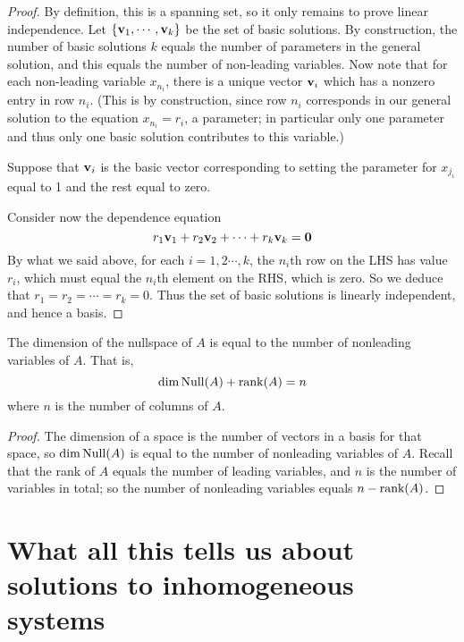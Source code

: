 \begin{proof}
By definition, this is a spanning set, so it only remains to prove linear independence.  Let $\{\mathbf{v}_1, \cdots, \mathbf{v}_k\}$ be the set of basic solutions.  
By construction, the number of basic solutions $k$ equals the number of parameters in the general solution, and this equals the number of non-leading variables.  
Now note that for each non-leading variable $x_{n_i}$, 
there is a unique vector $\mathbf{v}_i$ which has a nonzero entry in row $n_i$. 
(This is by construction, since row $n_i$ corresponds in our general
solution to the equation $x_{n_i} = r_i$, a parameter; in particular
only one parameter and thus only one basic solution contributes to
this variable.)

Suppose that $\mathbf{v}_i$ is the basic vector corresponding to setting the parameter for $x_{j_i}$ equal to 1 and the rest equal to zero.

Consider now the dependence equation
$$
r_1 \mathbf{v}_1 + r_2 \mathbf{v}_2 + \cdots + r_k \mathbf{v}_k = \mathbf{0}
$$
By what we said above, for each $i = 1,2 \cdots, k$, 
the $n_i$th row on the LHS has value $r_i$, which
must equal the $n_i$th element on the RHS, which is zero.  So we
deduce that $r_1=r_2 = \cdots = r_k = 0$.  Thus the set of basic
solutions is linearly independent, and hence a basis.
\end{proof}

\begin{corollary}\label{corollary:ranknull}

The dimension of the nullspace of $A$ is equal to the number of nonleading
variables of $A$.  That is,
$$
\dim \operatorname{Null}(A)  + \operatorname{rank}(A) = n
$$
where $n$ is the number of columns of $A$.
\end{corollary}

\begin{proof}
The dimension of a space is the number of vectors in a basis for that
space, so $\dim\operatorname{Null}(A)$ is  equal to the number of nonleading
variables of $A$.  Recall that the rank of $A$ equals
the number of leading variables, and $n$ is the number of variables in
total; so the number of nonleading variables equals $n-\textrm{rank}(A)$.
\end{proof}


\section{What all this tells us about solutions to inhomogeneous systems}

